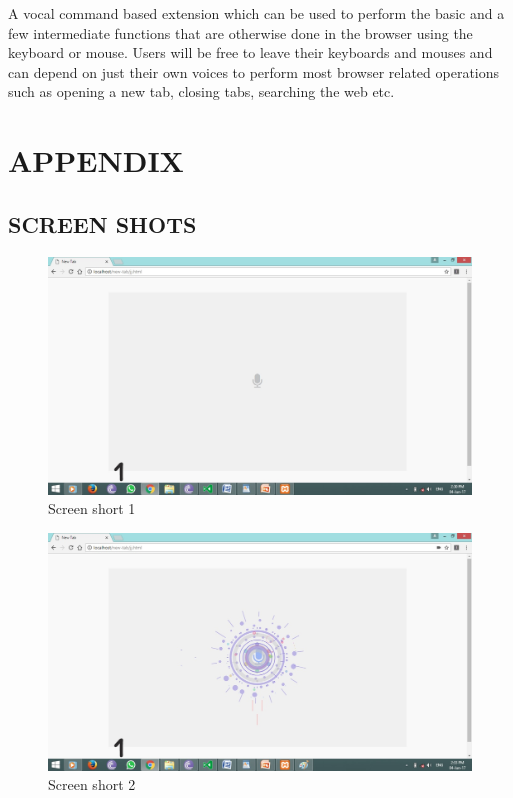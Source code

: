 \documentclass[11pt]{report} %
\begin{document}
A vocal command based extension which can be used to perform the basic and a few intermediate functions that are otherwise done in the browser using the keyboard or mouse.
Users will be free to leave their keyboards and mouses and can depend on just their own voices to perform most browser related operations such as opening a new tab, closing tabs, searching the web etc. 

\chapter{APPENDIX}


\section{SCREEN SHOTS} 
\label{App:SCREEN SHOTS}

\begin{figure}[ht]
	\centering
	\includegraphics[width=\linewidth]{figures/screen1.jpg}
	\caption{Screen short 1}
	\label{fig:Screen short 1}
\end{figure}


\begin{figure}[ht]
	\centering
	\includegraphics[width=\linewidth]{figures/screen2.jpg}
	\caption{Screen short 2}
	\label{fig:Screen short 2}
\end{figure}
\end{document}
